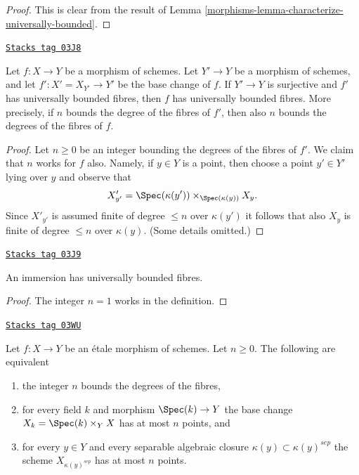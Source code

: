 \begin{proof}

This is clear from the result of
Lemma \ref{morphisms-lemma-characterize-universally-bounded}.
\end{proof}

\begin{lemma}
\label{morphisms-lemma-descent-universally-bounded}
\href{https://stacks.math.columbia.edu/tag/03J8}{\texttt{Stacks tag 03J8}}

Let $f : X \to Y$ be a morphism of schemes.
Let $Y' \to Y$ be a morphism of schemes, and let
$f' : X' = X_{Y'} \to Y'$ be the base change of $f$.
If $Y' \to Y$ is surjective and $f'$ has universally bounded fibres,
then $f$ has universally bounded fibres. More precisely, if $n$ bounds
the degree of the fibres of $f'$, then also $n$ bounds the degrees
of the fibres of $f$.
\end{lemma}

\begin{proof}
Let $n \geq 0$ be an integer bounding the degrees of the fibres of $f'$.
We claim that $n$ works for $f$ also. Namely, if $y \in Y$ is a point,
then choose a point $y' \in Y'$ lying over $y$ and observe that
$$
X'_{y'} = \Spec(\kappa(y')) \times_{\Spec(\kappa(y))} X_y.
$$
Since $X'_{y'}$ is assumed finite of degree $\leq n$ over $\kappa(y')$
it follows that also $X_y$ is finite of degree $\leq n$ over $\kappa(y)$.
(Some details omitted.)
\end{proof}

\begin{lemma}
\label{morphisms-lemma-immersion-universally-bounded}
\href{https://stacks.math.columbia.edu/tag/03J9}{\texttt{Stacks tag 03J9}}

An immersion has universally bounded fibres.
\end{lemma}

\begin{proof}
The integer $n = 1$ works in the definition.
\end{proof}

\begin{lemma}
\label{morphisms-lemma-etale-universally-bounded}
\href{https://stacks.math.columbia.edu/tag/03WU}{\texttt{Stacks tag 03WU}}

Let $f : X \to Y$ be an \'etale morphism of schemes.
Let $n \geq 0$. The following are equivalent
\begin{enumerate}
\item the integer $n$ bounds the degrees of the fibres,
\item for every field $k$ and morphism $\Spec(k) \to Y$ the
base change $X_k = \Spec(k) \times_Y X$ has at most $n$ points, and
\item for every $y \in Y$ and every separable algebraic closure
$\kappa(y) \subset \kappa(y)^{sep}$ the scheme
$X_{\kappa(y)^{sep}}$ has at most $n$ points.
\end{enumerate}
\end{lemma}

